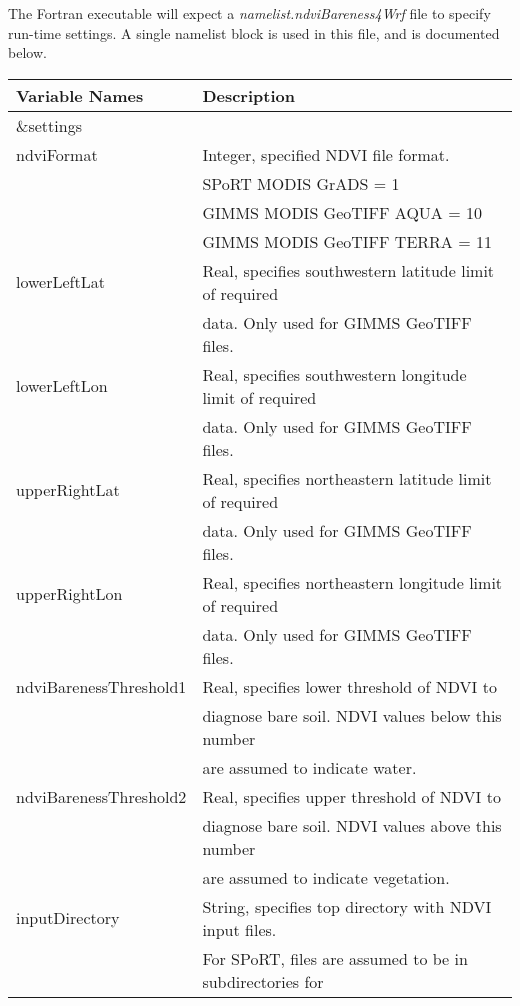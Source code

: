 \documentclass{article}
\begin{document}
\begin{itemize}
\end{itemize}

The Fortran executable will expect a \textit{namelist.ndviBareness4Wrf} file
to specify run-time settings.  A single namelist block is used in this file,
and is documented below.

\begin{tabular}{|l|l|} \hline
Variable Names & Description \\ \hline
\&settings & \\ \hline
ndviFormat & Integer, specified NDVI file format. \\
           & SPoRT MODIS GrADS = 1 \\
           & GIMMS MODIS GeoTIFF AQUA = 10 \\ 
           & GIMMS MODIS GeoTIFF TERRA = 11 \\ \hline
lowerLeftLat & Real, specifies southwestern latitude limit of required \\
             & data. Only used for GIMMS GeoTIFF files. \\ \hline
lowerLeftLon & Real, specifies southwestern longitude limit of required \\
             & data. Only used for GIMMS GeoTIFF files. \\ \hline
upperRightLat & Real, specifies northeastern latitude limit of required \\
              & data. Only used for GIMMS GeoTIFF files. \\ \hline
upperRightLon & Real, specifies northeastern longitude limit of required \\
              & data. Only used for GIMMS GeoTIFF files. \\ \hline
ndviBarenessThreshold1 & Real, specifies lower threshold of NDVI to \\
                       & diagnose bare soil.  NDVI values below this number \\
                       & are assumed to indicate water. \\ \hline
ndviBarenessThreshold2 & Real, specifies upper threshold of NDVI to \\
                       & diagnose bare soil.  NDVI values above this number \\
                       & are assumed to indicate vegetation. \\ \hline
inputDirectory & String, specifies top directory with NDVI input files. \\
               & For SPoRT, files are assumed to be in subdirectories for \\

\end{tabular}
\end{document}
